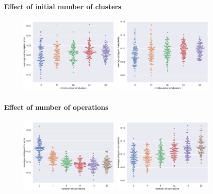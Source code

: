 \documentclass[t,18pt]{beamer}
\begin{document}
\begin{frame}[c]
  \frametitle{}
  \framesubtitle{Effect of initial number of clusters}
  \begin{figure}
    \includegraphics[width=5cm]{../Thesis/Resources/Evaluation-AverageCartographicError-n.pdf}
    \quad
    \includegraphics[width=5cm]{../Thesis/Resources/Evaluation-AveragePolygonComplexity-n.pdf}
  \end{figure}
\end{frame}

\begin{frame}[c]
  \frametitle{}
  \framesubtitle{Effect of number of operations}
  \begin{figure}
    \includegraphics[width=5cm]{../Thesis/Resources/Evaluation-AverageCartographicError-t.pdf}
    \quad
    \includegraphics[width=5cm]{../Thesis/Resources/Evaluation-AveragePolygonComplexity-t.pdf}
  \end{figure}
\end{frame}
\end{document}
